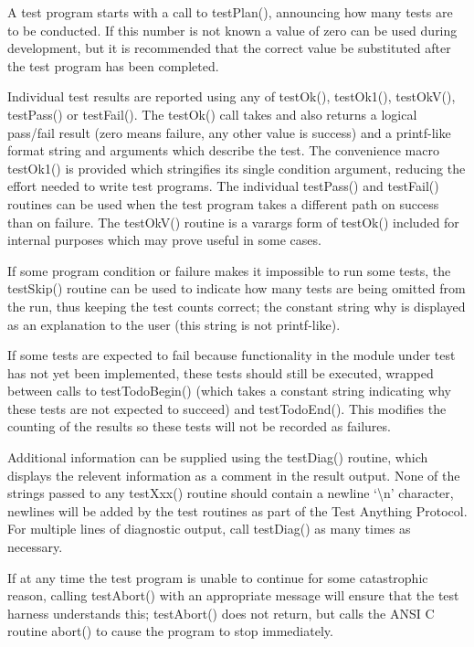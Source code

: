 A test program starts with a call to testPlan(), announcing how many tests are to be conducted.  If this number is not 
known a value of zero can be used during development, but it is recommended that the correct value be substituted after 
the test program has been completed.

Individual test results are reported using any of testOk(), testOk1(), testOkV(), testPass() or testFail(). The testOk() call 
takes and also returns a logical pass/fail result (zero means failure, any other value is success) and a printf-like format 
string and arguments which describe the test. The convenience macro testOk1() is provided which stringifies its single 
condition argument, reducing the effort needed to write test programs. The individual testPass() and testFail() routines can 
be used when the test program takes a different path on success than on failure. The testOkV() routine is a varargs form of 
testOk() included for internal purposes which may prove useful in some cases.

If some program condition or failure makes it impossible to run some tests, the testSkip() routine can be used to indicate 
how many tests are being omitted from the run, thus keeping the test counts correct; the constant string why is displayed 
as an explanation to the user (this string is not printf-like).

If some tests are expected to fail because functionality in the module under test has not yet been implemented, these tests 
should still be executed, wrapped between calls to testTodoBegin() (which takes a constant string indicating why these 
tests are not expected to succeed) and testTodoEnd(). This modifies the counting of the results so these tests will not be 
recorded as failures.

Additional information can be supplied using the testDiag() routine, which displays the relevent information as a 
comment in the result output. None of the strings passed to any testXxx() routine should contain a newline `\textbackslash{}n' character, 
newlines will be added by the test routines as part of the Test Anything Protocol.  For multiple lines of diagnostic output, 
call testDiag() as many times as necessary.

If at any time the test program is unable to continue for some catastrophic reason, calling testAbort() with an appropriate 
message will ensure that the test harness understands this; testAbort() does not return, but calls the ANSI C routine abort() 
to cause the program to stop immediately.

